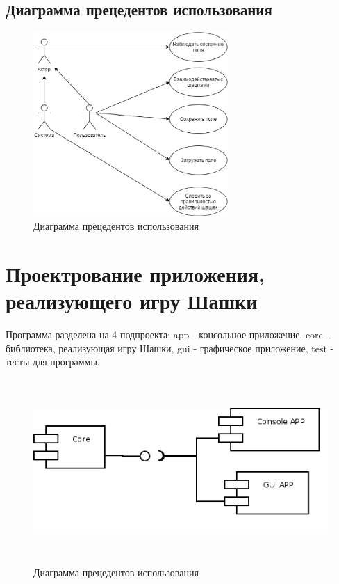 \documentclass[a4paper]{article}
\begin{document}
\subsection{Диаграмма прецедентов использования}

\begin{figure}[H]
	\begin{center}
		\includegraphics[scale=0.4, height=7cm]{Diagram1}
		\caption{Диаграмма прецедентов использования} 
		\label{pic:Diagram1} %
	\end{center}
\end{figure}

\section{Проектрование приложения, реализующего игру Шашки}
Программа разделена на 4 подпроекта: app - консольное приложение, core - библиотека, реализующая игру Шашки, gui - графическое приложение, test - тесты для программы.

\begin{figure}[H]
	\begin{center}
		\includegraphics[scale=0.4, height=7cm]{Diagram2}
		\caption{Диаграмма прецедентов использования} 
		\label{pic:Diagram2} %
	\end{center}
\end{figure}
\end{document}
